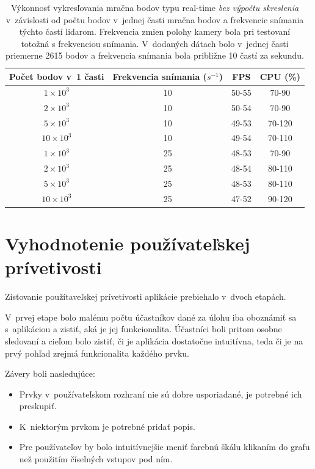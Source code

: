 \begin{table}[t]
    \centering
    \begin{tabular}{c|c||c|c}
        Počet bodov v~1 časti & Frekvencia snímania ($s^{-1}$) & FPS & CPU (\%) \\ \hline
        { }$1\times10^3$ & 10 & 50-55 & 70-90 \\
        { }$2\times10^3$ & 10 & 50-54 & 70-90 \\
        { }$5\times10^3$ & 10 & 49-53 & 70-120 \\
        $10\times10^3$ & 10 & 49-54 & 70-110 \\ \hline
        { }$1\times10^3$ & 25 & 48-53 & 70-90 \\
        { }$2\times10^3$ & 25 & 48-54 & 80-110 \\
        { }$5\times10^3$ & 25 & 48-53 & 80-110 \\
        $10\times10^3$ & 25 & 47-52 & 90-120 \\
    \end{tabular}
    \caption{Výkonnosť vykresľovania mračna bodov typu real-time \emph{bez výpočtu skreslenia} v~závislosti od počtu bodov v~jednej časti mračna bodov a frekvencie snímania týchto častí lidarom. Frekvencia zmien polohy kamery bola pri testovaní totožná s frekvenciou snímania. V~dodaných dátach bolo v~jednej časti priemerne 2615 bodov a frekvencia snímania bola približne 10 častí za sekundu.}
    \label{tab:vykonnost_realtime}
\end{table}

\section{Vyhodnotenie používateľskej prívetivosti}

Zisťovanie použítaveľskej prívetivosti aplikácie prebiehalo v~dvoch etapách.

V~prvej etape bolo malému počtu účastníkov dané za úlohu iba oboznámiť sa s~aplikáciou a zistiť, aká je jej funkcionalita. Účastníci boli pritom osobne sledovaní a cieľom bolo zistiť, či je aplikácia dostatočne intuitívna, teda či je na prvý pohľad zrejmá funkcionalita každého prvku.

\pagebreak

Závery boli nasledujúce:
\begin{itemize}
    \item Prvky v~používateľskom rozhraní nie sú dobre usporiadané, je potrebné ich preskupiť.
    \item K~niektorým prvkom je potrebné pridať popis.
    \item Pre používateľov by bolo intuitívnejšie meniť farebnú škálu klikaním do grafu než použitím číselných vstupov pod ním.
\end{itemize}

